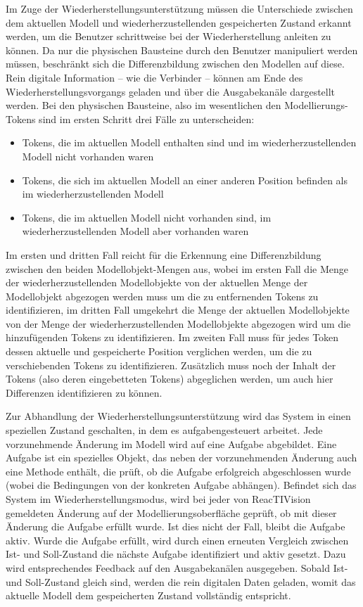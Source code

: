 Im Zuge der Wiederherstellungsunterstützung müssen die Unterschiede zwischen dem aktuellen Modell und wiederherzustellenden gespeicherten Zustand erkannt werden, um die Benutzer schrittweise bei der Wiederherstellung anleiten zu können. Da nur die physischen Bausteine durch den Benutzer manipuliert werden müssen, beschränkt sich die Differenzbildung zwischen den Modellen auf diese. Rein digitale Information -- wie die Verbinder -- können am Ende des Wiederherstellungsvorgangs geladen und über die Ausgabekanäle dargestellt werden. Bei den physischen Bausteine, also im wesentlichen den Modellierungs-Tokens sind im ersten Schritt drei Fälle zu unterscheiden:
\begin{itemize}
	\item Tokens, die im aktuellen Modell enthalten sind und im wiederherzustellenden Modell nicht vorhanden waren
	\item Tokens, die sich im aktuellen Modell an einer anderen Position befinden als im wiederherzustellenden Modell
	\item Tokens, die im aktuellen Modell nicht vorhanden sind, im wiederherzustellenden Modell aber vorhanden waren
\end{itemize}
Im ersten und dritten Fall reicht für die Erkennung eine Differenzbildung zwischen den beiden Modellobjekt-Mengen aus, wobei im ersten Fall die Menge der wiederherzustellenden Modellobjekte von der aktuellen Menge der Modellobjekt abgezogen werden muss um die zu entfernenden Tokens zu identifizieren, im dritten Fall umgekehrt die Menge der aktuellen Modellobjekte von der Menge der wiederherzustellenden Modellobjekte abgezogen wird um die hinzufügenden Tokens zu identifizieren. Im zweiten Fall muss für jedes Token dessen aktuelle und gespeicherte Position verglichen werden, um die zu verschiebenden Tokens zu identifizieren. Zusätzlich muss noch der Inhalt der Tokens (also deren eingebetteten Tokens) abgeglichen werden, um auch hier Differenzen identifizieren zu können.

Zur Abhandlung der Wiederherstellungsunterstützung wird das System in einen speziellen Zustand geschalten, in dem es aufgabengesteuert arbeitet. Jede vorzunehmende Änderung im Modell wird auf eine Aufgabe abgebildet. Eine Aufgabe ist ein spezielles Objekt, das neben der vorzunehmenden Änderung auch eine Methode enthält, die prüft, ob die Aufgabe erfolgreich abgeschlossen wurde (wobei die Bedingungen von der konkreten Aufgabe abhängen). Befindet sich das System im Wiederherstellungsmodus, wird bei jeder von ReacTIVision gemeldeten Änderung auf der Modellierungsoberfläche geprüft, ob mit dieser Änderung die Aufgabe erfüllt wurde. Ist dies nicht der Fall, bleibt die Aufgabe aktiv. Wurde die Aufgabe erfüllt, wird durch einen erneuten Vergleich zwischen Ist- und Soll-Zustand die nächste Aufgabe identifiziert und aktiv gesetzt. Dazu wird entsprechendes Feedback auf den Ausgabekanälen ausgegeben. Sobald Ist- und Soll-Zustand gleich sind, werden die rein digitalen Daten geladen, womit das aktuelle Modell dem gespeicherten Zustand vollständig entspricht. 

